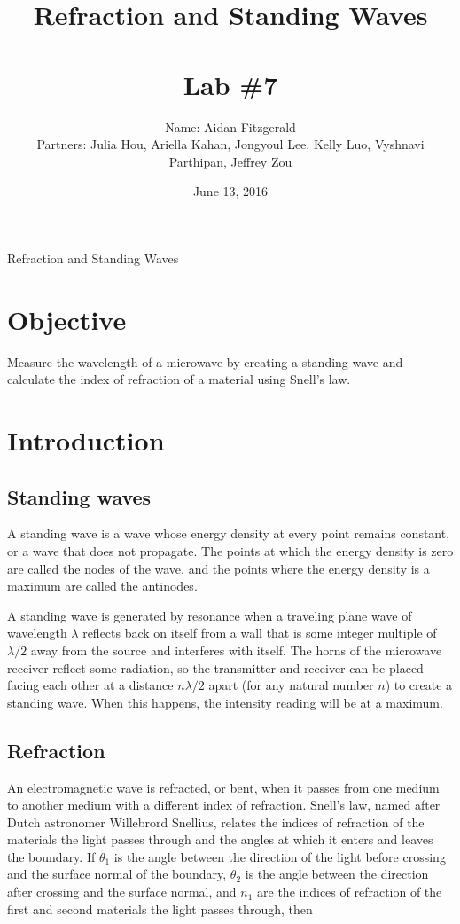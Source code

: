 \documentclass[11pt, titlepage, letterpaper, twoside]{article}
\title{\textbf{Refraction and Standing Waves} \\ \ \\ \large Lab \#7 }
\author{Name: Aidan Fitzgerald \\ Partners: Julia Hou, Ariella Kahan, Jongyoul Lee, Kelly Luo, Vyshnavi Parthipan, Jeffrey Zou}
\date{June 13, 2016}
\begin{document}
\maketitle

\begin{center}
\LARGE Refraction and Standing Waves
\end{center}

\section*{Objective}

Measure the wavelength of a microwave by creating a standing wave and calculate the index of refraction of a material
using Snell's law.

\section{Introduction}

\subsection{Standing waves}

A standing wave is a wave whose energy density at every point remains constant, or a wave that does not propagate.
The points at which the energy density is zero are called the nodes of the wave, and the points where the energy
density is a maximum are called the antinodes.

A standing wave is generated by resonance when a traveling plane wave of wavelength $\lambda$ reflects back on itself
from a wall that is some integer multiple of $\lambda/2$ away from the source and interferes with itself. The horns
of the microwave receiver reflect some radiation, so the transmitter and receiver can be placed facing each other at
a distance $n\lambda/2$ apart (for any natural number $n$) to create a standing wave. When this happens, the intensity
reading will be at a maximum.

\subsection{Refraction}

An electromagnetic wave is refracted, or bent, when it passes from one medium to another medium with a different index
of refraction. Snell's law, named after Dutch astronomer Willebrord Snellius, relates the indices of refraction of the
materials the light passes through and the angles at which it enters and leaves the boundary. If $\theta_1$ is the
angle between the direction of the light before crossing and the surface normal of the boundary, $\theta_2$ is the
angle between the direction after crossing and the surface normal, and $n_1$ are the indices of refraction of the first
and second materials the light passes through, then
\end{document}

